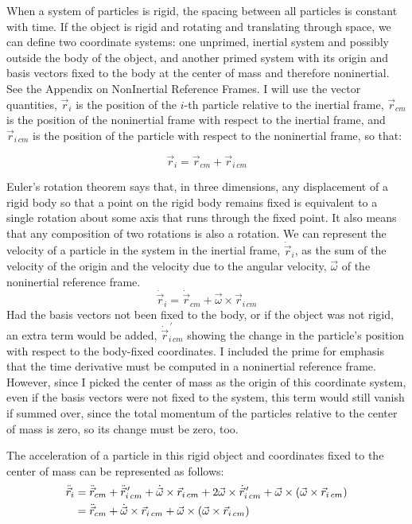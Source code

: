 \documentclass[10pt]{article}
\begin{document}
When a system of particles is rigid, the spacing between all particles 
is constant with time. If the object is rigid and rotating and translating 
through space, we can define two coordinate systems: one unprimed, inertial 
system and possibly outside the body of the object, and another 
primed system with its
origin and basis vectors fixed to the body at the center of 
mass and therefore noninertial. See 
the Appendix on NonInertial Reference Frames. I will use the 
vector quantities, $\vec{r}_i$ is the position of the $i$-th particle 
relative to the inertial frame, $\vec{r}_{cm}$ 
is the position of the noninertial 
frame with respect to the inertial frame, and $\vec{r}_{i\,cm}$ 
is the position of the particle with respect to the noninertial frame, so that:

\begin{equation}
    \vec{r}_i = \vec{r}_{cm}+\vec{r}_{i\,cm}
\end{equation}

Euler's rotation theorem says that, in three dimensions, any displacement 
of a rigid body so that a point on the rigid body remains fixed is 
equivalent to a single rotation about some axis that runs through the 
fixed point. It also means that any composition of two rotations is 
also a rotation. We can represent the velocity of a particle in the 
system in the inertial frame, $\dot{\vec{r}}_i$, 
as the sum of the velocity of the origin and the velocity due 
to the angular velocity, $\vec{\omega}$ of the noninertial reference frame.
\begin{equation}
    \dot{\vec{r}}_i = \dot{\vec{r}}_{cm} + \vec{\omega}\times\vec{r}_{i\,cm}
\end{equation}
Had the basis vectors not been fixed to the body, or if the 
object was not rigid, an extra term would be added, 
$\dot{\vec{r}}^{\,\prime}_{i\,cm}$ 
showing the change in the particle's position with respect to the body-fixed 
coordinates. I included the prime for emphasis that the time derivative 
must be computed in a noninertial reference frame. However, since I picked 
the center of mass as the origin of this coordinate system, even if the 
basis vectors were not fixed to the system, this term would still vanish 
if summed over, since the total momentum of the particles relative to the 
center of mass is zero, so its change must be zero, too.

The acceleration of a particle in this rigid object and coordinates fixed 
to the center of mass can be represented as follows:
\begin{align}
    \ddot{\vec{r}}_i 
        &= \ddot{\vec{r}}_{cm} + \ddot{\vec{r}}^{\,\prime}_{i\,cm} +
        \dot{\vec{\omega}}\times\vec{r}_{i\,cm} + 
        2\vec{\omega}\times\dot{\vec{r}}^{\,\prime}_{i\,cm} + 
        \vec{\omega}\times(\vec{\omega}\times\vec{r}_{i\,cm}) \notag \\
        &= \ddot{\vec{r}}_{cm} + \dot{\vec{\omega}}\times\vec{r}_{i\,cm} + 
        \vec{\omega}\times(\vec{\omega}\times\vec{r}_{i\,cm})
\end{align}
\end{document}
